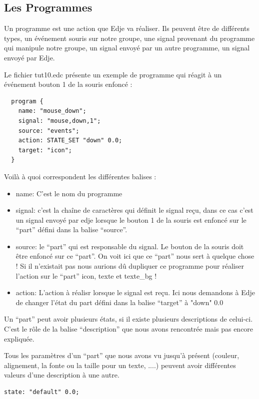 \documentclass[a4paper]{efr}
\begin{document}
\subsection{Les Programmes}

Un programme est une action que Edje va réaliser. Ils peuvent être de différents
types, un événement souris sur notre groupe, une signal provenant du programme
qui manipule notre groupe, un signal envoyé par un autre programme, un signal
envoyé par Edje.

Le fichier tut10.edc présente un exemple de programme qui réagit à un événement
bouton 1 de la souris enfoncé :

\begin{lstlisting}
  program {
    name: "mouse_down";
    signal: "mouse,down,1";
    source: "events";
    action: STATE_SET "down" 0.0;
    target: "icon";
  }
\end{lstlisting}

Voilà à quoi correspondent les différentes balises :

\begin{itemize}
\item name: C'est le nom du programme
\item signal: c'est la chaîne de caractères qui définit le signal reçu, dans ce
cas c'est un signal envoyé par edje lorsque le bouton 1 de la souris est enfoncé
sur le ``part'' défini dans la balise ``source''.
\item source: le ``part'' qui est responsable du signal. Le bouton de la souris doit être enfoncé sur ce
``part''. On voit ici que ce ``part'' nous sert à quelque chose ! Si il n'existait pas
nous aurions dû dupliquer ce programme pour réaliser l'action sur le ``part'' icon,
texte et texte\_bg !
\item action: L'action à réalisr lorsque le signal est reçu. Ici nous demandons
à Edje de changer l'état du part défini dans la balise ``target'' à "down" 0.0
\end{itemize}

Un ``part'' peut avoir plusieurs états, si il existe plusieurs descriptions de celui-ci.
C'est le rôle de la balise ``description'' que nous avons rencontrée mais pas
encore expliquée.

Tous les paramètres d'un ``part'' que nous avons vu jusqu'à présent (couleur,
alignement, la fonte ou la taille pour un texte, ....) peuvent avoir différentes
valeurs d'une description à une autre.

\begin{lstlisting}
state: "default" 0.0;
\end{lstlisting}
\end{document}
